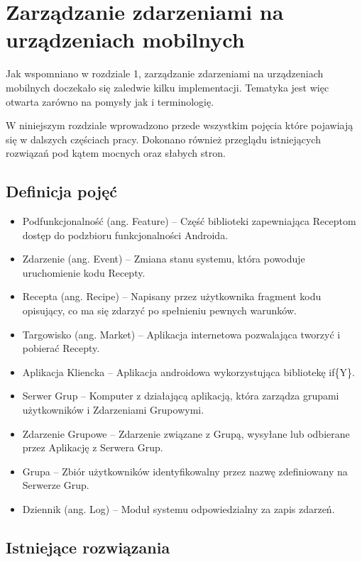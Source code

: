 \documentclass[11pt,a4paper,polish,thesis]{dcsbook}
\begin{document}
\chapter{Zarządzanie zdarzeniami na urządzeniach mobilnych}
Jak wspomniano w rozdziale 1, zarządzanie zdarzeniami na urządzeniach mobilnych doczekało się zaledwie kilku implementacji. Tematyka jest więc otwarta
zarówno na pomysły jak i terminologię.

W niniejszym rozdziale wprowadzono przede wszystkim pojęcia które pojawiają się w dalszych częściach pracy. Dokonano również przeglądu istniejących rozwiązań
pod kątem mocnych oraz słabych stron.

\section{Definicja pojęć}
\begin{itemize}
\item Podfunkcjonalność (ang. Feature) -- Część biblioteki zapewniająca Receptom dostęp do podzbioru funkcjonalności Androida.
\item Zdarzenie (ang. Event) -- Zmiana stanu systemu, która powoduje uruchomienie kodu Recepty.
\item Recepta (ang. Recipe) -- Napisany przez użytkownika fragment kodu opisujący, co ma się zdarzyć po spełnieniu pewnych warunków.
\item Targowisko (ang. Market) -- Aplikacja internetowa pozwalająca tworzyć i pobierać Recepty.
\item Aplikacja Kliencka -- Aplikacja androidowa wykorzystująca bibliotekę if\{Y\}. 
\item Serwer Grup -- Komputer z działającą aplikacją, która zarządza grupami użytkowników i Zdarzeniami Grupowymi.
\item Zdarzenie Grupowe -- Zdarzenie związane z Grupą, wysyłane lub odbierane przez Aplikację z Serwera Grup.
\item Grupa -- Zbiór użytkowników identyfikowalny przez nazwę zdefiniowany na Serwerze Grup.
\item Dziennik (ang. Log) -- Moduł systemu odpowiedzialny za zapis zdarzeń.
\end{itemize}
\section{Istniejące rozwiązania}
\end{document}
